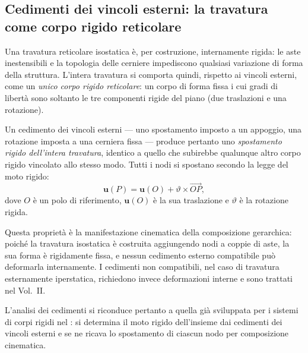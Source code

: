 \subsection{Cedimenti dei vincoli esterni:
	la travatura come corpo rigido reticolare}
\label{subsec:cedimenti_reticolare}

Una travatura reticolare isostatica è, per costruzione,
internamente rigida: le aste inestensibili e la topologia
delle cerniere impediscono qualsiasi variazione di forma
della struttura. L'intera travatura si comporta quindi,
rispetto ai vincoli esterni, come un \emph{unico corpo
	rigido reticolare}: un corpo di forma fissa i cui
gradi di libertà sono soltanto le tre componenti
rigide del piano (due traslazioni e una rotazione).

Un cedimento dei vincoli esterni --- uno spostamento
imposto a un appoggio, una rotazione imposta a una
cerniera fissa --- produce pertanto uno
\emph{spostamento rigido dell'intera travatura},
identico a quello che subirebbe qualunque altro corpo
rigido vincolato allo stesso modo. Tutti i nodi si
spostano secondo la legge del moto rigido:
\begin{equation}\label{eq:moto_rigido_reticolare}
	\mathbf{u}(P) = \mathbf{u}(O) +
	\vartheta \times \overrightarrow{OP},
\end{equation}
dove $O$ è un polo di riferimento, $\mathbf{u}(O)$ è
la sua traslazione e $\vartheta$ è la rotazione rigida.

\begin{oss}
	Questa proprietà è la manifestazione cinematica
	della composizione gerarchica: poiché la travatura
	isostatica è costruita aggiungendo nodi a coppie
	di aste, la sua forma è rigidamente fissa, e nessun
	cedimento esterno compatibile può deformarla
	internamente. I cedimenti non compatibili, nel caso
	di travatura esternamente iperstatica, richiedono
	invece deformazioni interne e sono trattati nel
	Vol.~II.
\end{oss}

L'analisi dei cedimenti si riconduce pertanto a quella
già sviluppata per i sistemi di corpi rigidi nel
: si determina il
moto rigido dell'insieme dai cedimenti dei vincoli
esterni e se ne ricava lo spostamento di ciascun
nodo per composizione cinematica.

